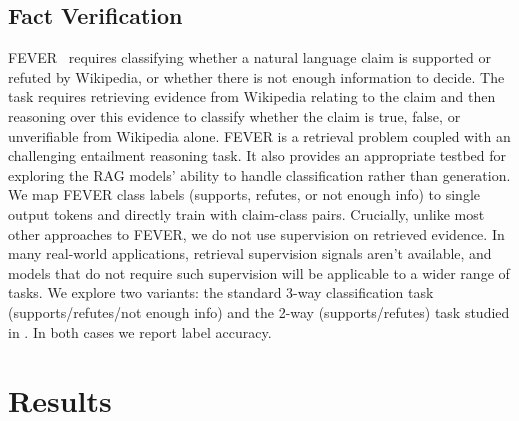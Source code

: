 \documentclass{article}
\begin{document}
\subsection{Fact Verification}

FEVER~\cite{thorne-etal-2018-fever} requires classifying whether a natural language claim is supported or refuted by Wikipedia, or whether there is not enough information to decide. The task requires retrieving evidence from Wikipedia relating to the claim and then reasoning over this evidence to classify whether the claim is true, false, or unverifiable from Wikipedia alone.
FEVER is a retrieval problem coupled with an challenging entailment reasoning task. It also  
provides an appropriate testbed for exploring the RAG models' ability to handle classification rather than generation. 
We map FEVER class labels (supports, refutes, or not enough info) to single output tokens and directly train with claim-class pairs. Crucially, unlike most other approaches to FEVER, we do not use supervision on retrieved evidence. In many real-world applications, retrieval supervision signals aren't available, and models that do not require such supervision will be applicable to a wider range of tasks. 
We explore two variants: the standard 3-way classification task (supports/refutes/not enough info) and the 2-way (supports/refutes) task studied in \citet{Thorne2020AvoidingCF}. In both cases we report label accuracy.
 
\section{Results}
\end{document}
